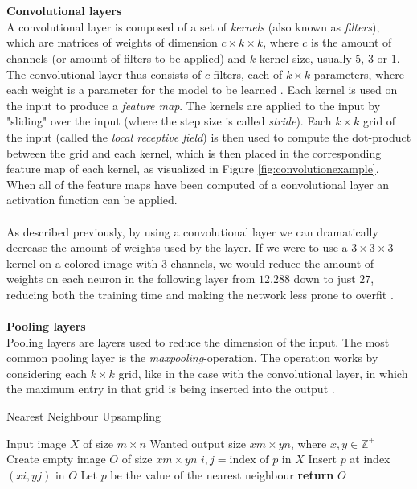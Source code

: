 \documentclass[./main.tex]{subfiles}
\begin{document}
\\
\\
\textbf{Convolutional layers} \\
A convolutional layer is composed of a set of \textit{kernels} (also known as \textit{filters}), which are matrices of weights of dimension $c \times k \times k$, where $c$ is the amount of channels (or amount of filters to be applied) and $k$ kernel-size, usually $5$, $3$ or $1$. The convolutional layer thus consists of $c$ filters, each of $k \times k$ parameters, where each weight is a parameter for the model to be learned \cite{Everything}. Each kernel is used on the input to produce a \textit{feature map}. The kernels are applied to the input by "sliding" over the input (where the step size is called \textit{stride}). Each $k \times k$ grid of the input (called the \textit{local receptive field}) is then used to compute the dot-product between the grid and each kernel, which is then placed in the corresponding feature map of each kernel, as visualized in Figure \ref{fig:convolutionexample}. When all of the feature maps have been computed of a convolutional layer an activation function can be applied.
\\
\\
As described previously, by using a convolutional layer we can dramatically decrease the amount of weights used by the layer. If we were to use a $3 \times 3 \times 3$ kernel on a colored image with $3$ channels, we would reduce the amount of weights on each neuron in the following layer from $12.288$ down to just $27$, reducing both the training time and making the network less prone to overfit \cite{CNN}.
\\
\\
\textbf{Pooling layers} \\
Pooling layers are layers used to reduce the dimension of the input. The most common pooling layer is the \textit{maxpooling}-operation. The operation works by considering each $k \times k$ grid, like in the case with the convolutional layer, in which the maximum entry in that grid is being inserted into the output \cite{CNN}.
\\
\begin{algorithm}[htbp]
    \caption{Nearest Neighbour Upsampling \cite{NNUpsampling}}
    \label{Algorithm:NNUpsampling}
    \begin{algorithmic}[1]
        \Require Input image $X$ of size $m \times n$
        \Require Wanted output size $xm \times yn$, where $x, y \in \mathbb{Z}^{+}$
        \State Create empty image $O$ of size $xm \times yn$
            \State $i,j = \text{index of } p \text{ in } X$
            \State Insert $p$ at index $(xi, yj)$ in $O$
        \EndFor
            \State Let $p$ be the value of the nearest neighbour
        \EndFor
        \State \textbf{return} $O$
    \end{algorithmic}
\end{algorithm}
\end{document}
